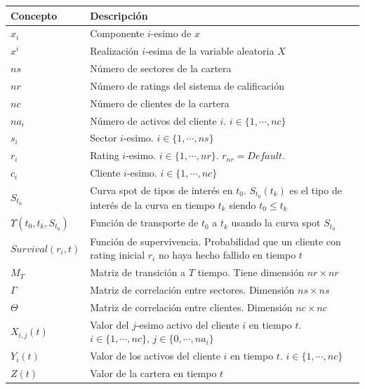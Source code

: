 \begin{tabular}{|p{2.5cm}|p{9cm}|}
\hline
\textbf{Concepto} & \textbf{Descripci\'on} \\
\hline
\hline
$x_i$ & Componente $i$-esimo de $x$ \\
\hline
$x^i$ & Realizaci\'on $i$-esima de la variable aleatoria $X$ \\
\hline
\hline
$ns$ & N\'umero de sectores de la cartera \\
\hline
$nr$ & N\'umero de ratings del sistema de calificaci\'on \\
\hline
$nc$ & N\'umero de clientes de la cartera \\
\hline
$na_i$ &  N\'umero de activos del cliente $i$. $i \in \{1,\cdots,nc\}$\\
\hline
\hline
$s_i$ & Sector $i$-esimo. $i \in \{1,\cdots,ns\}$ \\
\hline
$r_i$ & Rating $i$-esimo. $i \in \{1,\cdots,nr\}$. $r_{nr}=Default$. \\
\hline
$c_i$ & Cliente $i$-esimo. $i \in \{1,\cdots,nc\}$ \\
\hline
\hline
$S_{t_0}$ & Curva spot de tipos de inter\'es en $t_0$. $S_{t_0}(t_k)$ es el
tipo de inter\'es de la curva en tiempo $t_k$ siendo $t_0 \leq t_k$\\
\hline
$\Upsilon(t_0,t_k, S_{t_0})$ & Funci\'on de transporte de $t_0$ a $t_k$ usando 
la curva spot $S_{t_0}$ \\
\hline
\hline
$Survival(r_i,t)$ & Funci\'on de supervivencia. Probabilidad que un cliente con 
rating inicial $r_i$ no haya hecho fallido en tiempo $t$\\
\hline
$M_T$ & Matriz de transici\'on a $T$ tiempo. Tiene dimensi\'on $nr \times nr$\\
\hline
$\Gamma$ & Matriz de correlaci\'on entre sectores. Dimensi\'on $ns \times ns$\\
\hline
$\Theta$ & Matriz de correlaci\'on entre clientes. Dimensi\'on $nc \times nc$\\
\hline
\hline
$X_{i,j}(t)$ & Valor del $j$-esimo activo del cliente $i$ en tiempo $t$. 
$i \in \{1,\cdots,nc\}$, $j \in \{0,\cdots,na_i\}$ \\
\hline
$Y_i(t)$ & Valor de los activos del cliente $i$ en tiempo $t$. $i \in \{1,\cdots,nc\}$ \\
\hline
$Z(t)$ & Valor de la cartera en tiempo $t$\\
\hline
\end{tabular}

